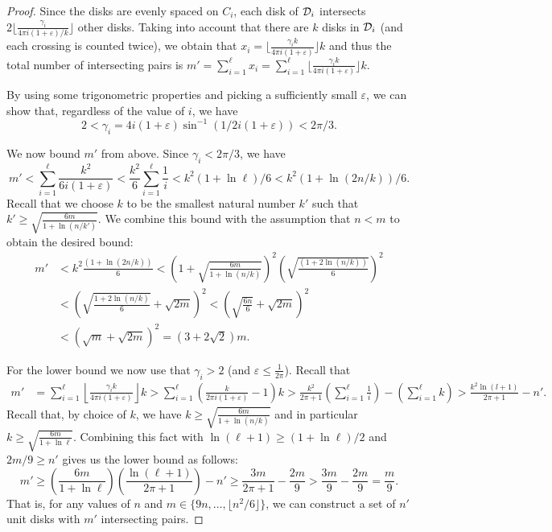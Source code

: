 \documentclass{llncs}
\begin{document}
\begin{proof}
Since the disks are evenly spaced on $C_i$, each disk of ${\cal D}_i$ intersects $2\lfloor \frac{\gamma_i}{4\pi i(1+\varepsilon)/k} \rfloor $ other disks. Taking into account that there are $k$ disks in ${\cal D}_i$ (and each crossing is counted twice), we obtain that $x_i= \lfloor\frac{\gamma_ik}{4\pi i(1+\varepsilon)}\rfloor k$ and thus the total number of intersecting pairs is $m'=\sum_{i=1}^{\ell} x_i = \sum_{i=1}^{\ell} \lfloor\frac{\gamma_ik}{4\pi i(1+\varepsilon)}\rfloor k$.


By using some trigonometric properties and picking a sufficiently small $\varepsilon$, we can show that, regardless of the value of $i$, we have 
$$2 < \gamma_i = 4i(1+\varepsilon)\sin^{-1}(1/2i(1+\varepsilon)) < 2\pi/3.$$ 


We now bound $m'$ from above.
Since $\gamma_i< 2\pi/3$, we have 
$$m' < \sum_{i=1}^{\ell} \frac{ k^2}{6 i(1+\varepsilon)} < \frac{k^2}{6}\sum_{i=1}^{\ell} \frac{1}{i} < k^2(1+\ln \ell)/6 < k^2(1+\ln (2n/k))/6.$$ Recall that we choose $k$ to be the smallest natural number $k'$ such that $k' \geq \sqrt{\frac{{6m}}{{1+\ln (n/k')}}}$. 
We combine this bound with the assumption that $n<m$ to obtain the desired bound:
\begin{align*}
 m' &< k^2\frac{(1+\ln (2n/k))}{6} 
     < \left(1+\sqrt{\frac{{6m}}{{1+\ln (n/k)}}}\right)^2 \left(\sqrt{\frac{(1+2\ln (n/k))}{6}}\right)^2 \\
    &< \left(\sqrt{\frac{1+2\ln (n/k)}{6}}+\sqrt{2m} \right)^2 <\left(\sqrt{\frac{6n}{6}}+\sqrt{2m} \right)^2 \\
    &<  (\sqrt{m}+\sqrt{2m})^2 =(3+2\sqrt{2}) m.
\end{align*}


For the lower bound we now use that $\gamma_i>2$ (and $\varepsilon \leq \frac{1}{2\pi}$). Recall that  
\begin{align*}
m' &= \sum_{i=1}^{\ell} \left\lfloor\frac{\gamma_ik}{4\pi i(1+\varepsilon)}\right\rfloor k >  \sum_{i=1}^{\ell} \left( \frac{k}{2\pi i(1+\varepsilon)} -1\right) k 
 >  \frac{k^2}{2\pi + 1} \left(\sum_{i=1}^{\ell} \frac{1}{i}\right)
 - \left(\sum_{i=1}^{\ell} k\right) > \frac{k^2 \ln(l+1)}{2\pi + 1} - n'.
\end{align*}
 Recall that, by choice of $k$, we have $k \geq \sqrt{\frac{{6m}}{{1+\ln (n/k)}}}$ and in particular $k \geq \sqrt{\frac{6m}{1+\ln \ell}}$. Combining this fact with $\ln(\ell+1) \geq (1+\ln \ell)/2$ and $2m/9 \geq n'$ gives us the lower bound as follows:
$$
m' \geq \left(\frac{6m}{1+\ln \ell }\right) \left(\frac{\ln(\ell+1)}{2\pi + 1}\right) - n' 
    \geq \frac{3m}{2\pi + 1} - \frac{2m}{9} > \frac{3m}{9} - \frac{2m}{9}=\frac{m}{9}.
$$
That is, for any values of $n$ and $m \in \{9n,\dots,\lfloor n^2/6 \rfloor\}$, we can construct a set of $n'$ unit disks with $m'$ intersecting pairs.




\end{proof}
\end{document}

